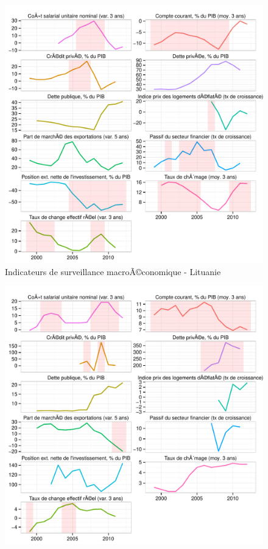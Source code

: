 \documentclass{article}\usepackage[]{graphicx}\usepackage[]{color}
\makeatletter
\def\maxwidth{ %
  \ifdim\Gin@nat@width>\linewidth
    \linewidth
  \else
    \Gin@nat@width
  \fi
}
\newenvironment{knitrout}{}{} %
\makeatother
\begin{document}
\begin{knitrout}
\begin{figure}[p]
{\centering \includegraphics[width=\maxwidth]{figure_graph/byco17} 

}

\caption[Indicateurs de surveillance macroÃ©conomique - Lituanie]{Indicateurs de surveillance macroÃ©conomique - Lituanie\label{fig:byco17}}
\end{figure}

\begin{figure}[p]


{\centering \includegraphics[width=\maxwidth]{figure_graph/byco18} 

}
\end{figure}
\end{knitrout}
\end{document}
